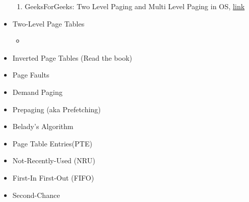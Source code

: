 \documentclass[12pt]{article}
\begin{document}
\begin{itemize}
    \begin{enumerate}[1)]
        \item GeeksForGeeks: Two Level Paging and Multi Level Paging in OS, \href{https://www.geeksforgeeks.org/two-level-paging-and-multi-level-paging-in-os/}{link}
    \end{enumerate}
    \item Two-Level Page Tables
    \begin{itemize}
        \item
    \end{itemize}
    \item Inverted Page Tables (Read the book)
    \item Page Faults
    \item Demand Paging
    \item Prepaging (aka Prefetching)
    \item Belady's Algorithm
    \item Page Table Entries(PTE)
    \item Not-Recently-Used (NRU)
    \item First-In First-Out (FIFO)
    \item Second-Chance

\end{itemize}
\end{document}
